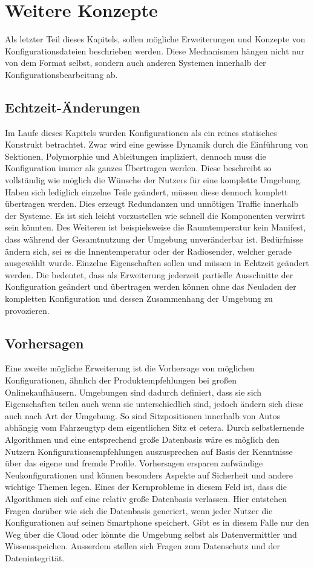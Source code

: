 \section{Weitere Konzepte}
Als letzter Teil dieses Kapitels, sollen mögliche Erweiterungen und Konzepte von Konfigurationsdateien beschrieben werden. Diese Mechanismen hängen nicht nur von dem Format selbst, sondern auch anderen Systemen innerhalb der Konfigurationsbearbeitung ab. 

\subsection{Echtzeit-Änderungen}
Im Laufe dieses Kapitels wurden Konfigurationen als ein reines statisches Konstrukt betrachtet. Zwar wird eine gewisse Dynamik durch die Einführung von Sektionen, Polymorphie und Ableitungen impliziert, dennoch muss die Konfiguration immer als ganzes Übertragen werden. Diese beschreibt so vollständig wie möglich die Wünsche der Nutzers für eine komplette Umgebung. Haben sich lediglich einzelne Teile geändert, müssen diese dennoch komplett übertragen werden. Dies erzeugt Redundanzen und unnötigen Traffic innerhalb der Systeme. Es ist sich leicht vorzustellen wie schnell die Komponenten verwirrt sein könnten. Des Weiteren ist beispielsweise die Raumtemperatur kein Manifest, dass während der Gesamtnutzung der Umgebung unveränderbar ist. Bedürfnisse ändern sich, sei es die Innentemperatur oder der Radiosender, welcher gerade ausgewählt wurde. Einzelne Eigenschaften sollen und müssen in Echtzeit geändert werden. Die bedeutet, dass als Erweiterung jederzeit partielle Ausschnitte der Konfiguration geändert und übertragen werden können ohne das Neuladen der kompletten Konfiguration und dessen Zusammenhang der Umgebung zu provozieren.

\subsection{Vorhersagen}
Eine zweite mögliche Erweiterung ist die Vorhersage von möglichen Konfigurationen, ähnlich der Produktempfehlungen bei großen Onlinekaufhäusern. Umgebungen sind dadurch definiert, dass sie sich Eigenschaften teilen auch wenn sie unterschiedlich sind, jedoch ändern sich diese auch nach Art der Umgebung. So sind Sitzpositionen innerhalb von Autos abhängig vom Fahrzeugtyp dem eigentlichen Sitz et cetera. Durch selbstlernende Algorithmen und eine entsprechend große Datenbasis wäre es möglich den Nutzern Konfigurationsempfehlungen auszusprechen auf Basis der Kenntnisse über das eigene und fremde Profile. Vorhersagen ersparen aufwändige Neukonfigurationen und können besonders Aspekte auf Sicherheit und andere wichtige Themen legen. Eines der Kernprobleme in diesem Feld ist, dass die Algorithmen sich auf eine relativ große Datenbasis verlassen. Hier entstehen Fragen darüber wie sich die Datenbasis generiert, wenn jeder Nutzer die Konfigurationen auf seinen Smartphone speichert. Gibt es in diesem Falle nur den Weg über die Cloud oder könnte die Umgebung selbst als Datenvermittler und Wissensspeichen. Ausserdem stellen sich Fragen zum Datenschutz und der Datenintegrität. 

